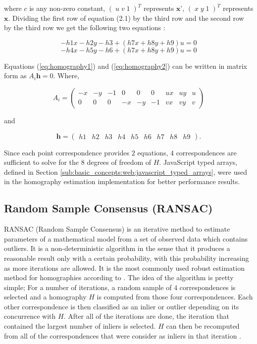 where $c$ is any non-zero constant, $(\; u \; v \; 1 \;)^T$ represents $\textbf{x'}$, $(\; x \; y \; 1 \;)^T$ represents $\textbf{x}$. Dividing the first row of equation (2.1) by the third row and the second row by the third row we get the following two equations \cite{Homography2009}:

\begin{equation}
\label{eq:homography1}
-h1x-h2y-h3 +(h7x+h8y+h9)u=0
\end{equation}
\begin{equation}
\label{eq:homography2}
-h4x-h5y-h6 +(h7x+h8y+h9)u=0
\end{equation}

Equations (\ref{eq:homography1}) and (\ref{eq:homography2}) can be written in matrix form as $A_i\textbf{h}=0$. Where,

$$A_i=\begin{pmatrix}-x & -y & -1 & 0 & 0 & 0 & ux & uy & u\\0 & 0 & 0 & -x & -y & -1 & vx & vy & v\end{pmatrix}$$

and

$$\textbf{h}=\begin{pmatrix}h1 & h2 & h3 & h4 & h5 & h6 & h7 & h8 & h9\end{pmatrix}.$$

Since each point correspondence provides $2$ equations, $4$ correspondences are sufficient to solve for the $8$ degrees of freedom of $H$. JavaScript typed arrays, defined in Section \ref{sub:basic_concepts:web:javascript_typed_arrays}, were used in the homography estimation implementation for better performance results.


\subsection{Random Sample Consensus (RANSAC)} %
\label{sub:tracking_library_for_the_web:marker_less_tracking_algorithm:ransac}

RANSAC (Random Sample Consensus) \cite{Hartley2004} is an iterative method to estimate parameters of a mathematical model from a set of observed data which contains outliers. It is a non-deterministic algorithm in the sense that it produces a reasonable result only with a certain probability, with this probability increasing as more iterations are allowed. It is the most commonly used robust estimation method for homographies according to \cite{Homography2009}. The idea of the algorithm is pretty simple; For a number of iterations, a random sample of $4$ correspondences is selected and a homography $H$ is computed from those four correspondences. Each other correspondence is then classified as an inlier or outlier depending on its concurrence with $H$. After all of the iterations are done, the iteration that contained the largest number of inliers is selected. $H$ can then be recomputed from all of the correspondences that were consider as inliers in that iteration \cite{Homography2009}.

